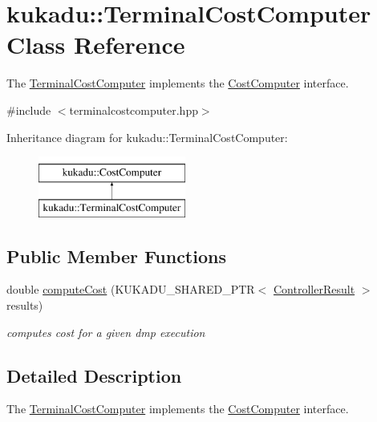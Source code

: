 \hypertarget{classkukadu_1_1TerminalCostComputer}{\section{kukadu\-:\-:Terminal\-Cost\-Computer Class Reference}
\label{classkukadu_1_1TerminalCostComputer}
}


The \hyperlink{classkukadu_1_1TerminalCostComputer}{Terminal\-Cost\-Computer} implements the \hyperlink{classkukadu_1_1CostComputer}{Cost\-Computer} interface.  




{\ttfamily \#include $<$terminalcostcomputer.\-hpp$>$}

Inheritance diagram for kukadu\-:\-:Terminal\-Cost\-Computer\-:\begin{figure}[H]
\begin{center}
\leavevmode
\includegraphics[height=2.000000cm]{classkukadu_1_1TerminalCostComputer}
\end{center}
\end{figure}
\subsection*{Public Member Functions}
\begin{DoxyCompactItemize}
\item 
double \hyperlink{classkukadu_1_1TerminalCostComputer_aec0329f108e413d004139f5da01f04e5}{compute\-Cost} (K\-U\-K\-A\-D\-U\-\_\-\-S\-H\-A\-R\-E\-D\-\_\-\-P\-T\-R$<$ \hyperlink{classkukadu_1_1ControllerResult}{Controller\-Result} $>$ results)
\begin{DoxyCompactList}\small\item\em computes cost for a given dmp execution \end{DoxyCompactList}\end{DoxyCompactItemize}


\subsection{Detailed Description}
The \hyperlink{classkukadu_1_1TerminalCostComputer}{Terminal\-Cost\-Computer} implements the \hyperlink{classkukadu_1_1CostComputer}{Cost\-Computer} interface. 

